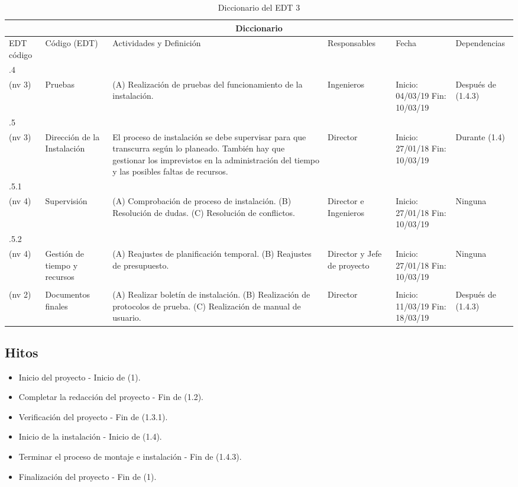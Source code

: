 \begin{table}[H]
\begin{tabular}{|m{1cm}|m{2cm}|m{5cm}|m{2cm}|m{2.5cm}|m{2.8cm}| }
\hline
 \multicolumn{6}{|c|}{\centering Diccionario} \\
\hline
\rowcolor{gray!50} \centering EDT código & \centering Código (EDT) & Actividades y Definición & Responsables & Fecha & Dependencias \\
\hline
 \centering 1.4.4\\ (nv 3) & \centering Pruebas & 
 (A) Realización de pruebas del funcionamiento de la instalación. & Ingenieros & Inicio: 04/03/19 Fin: 10/03/19 & Después de (1.4.3)\\
\hline
 \centering 1.4.5\\ (nv 3) & \centering Dirección de la Instalación & El proceso de instalación se debe supervisar para que transcurra según lo planeado. También hay que gestionar los imprevistos en la administración del tiempo y las posibles faltas de recursos.& \centering Director & Inicio: 27/01/18 Fin: 10/03/19 & Durante (1.4) \\
\hline
 \centering 1.4.5.1\\ (nv 4) & \centering Supervisión & 
(A) Comprobación de proceso de instalación. (B) Resolución de dudas. (C) Resolución de conflictos. & \centering Director e Ingenieros& Inicio: 27/01/18 Fin: 10/03/19 & Ninguna \\
 \hline
 \centering 1.4.5.2\\ (nv 4) & \centering Gestión de tiempo y recursos & (A) Reajustes de planificación temporal. (B) Reajustes de presupuesto. & \centering Director y Jefe de proyecto & Inicio: 27/01/18 Fin: 10/03/19 & Ninguna \\
\hline
 \centering 1.5\\ (nv 2) & \centering Documentos finales & (A) Realizar boletín de instalación.
(B) Realización de protocolos de prueba.
(C) Realización de manual de usuario. & \centering Director & Inicio: 11/03/19 Fin: 18/03/19 & Después de (1.4.3) \\
\hline
\end{tabular}
\caption{Diccionario del EDT 3}
\label{table:ta1}
\end{table}

\subsection{Hitos}

\begin{itemize}

\item Inicio del proyecto - Inicio de (1).
\item Completar la redacción del proyecto - Fin de (1.2).
\item Verificación del proyecto - Fin de (1.3.1).
\item Inicio de la instalación - Inicio de (1.4).
\item Terminar el proceso de montaje e instalación - Fin de (1.4.3).
\item Finalización del proyecto - Fin de (1).

\end{itemize}
\newpage
